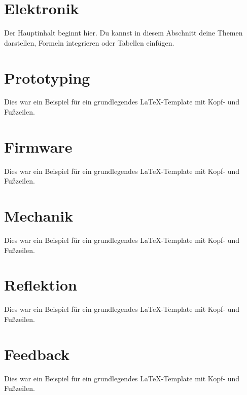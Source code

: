 \documentclass[a4paper,12pt]{scrartcl}
\begin{document}
\section{Elektronik}
Der Hauptinhalt beginnt hier. Du kannst in diesem Abschnitt deine Themen darstellen, Formeln integrieren oder Tabellen einfügen.

\section{Prototyping}
Dies war ein Beispiel für ein grundlegendes LaTeX-Template mit Kopf- und Fußzeilen.

\section{Firmware}
Dies war ein Beispiel für ein grundlegendes LaTeX-Template mit Kopf- und Fußzeilen.

\section{Mechanik}
Dies war ein Beispiel für ein grundlegendes LaTeX-Template mit Kopf- und Fußzeilen.

\section{Reflektion}
Dies war ein Beispiel für ein grundlegendes LaTeX-Template mit Kopf- und Fußzeilen.

\section{Feedback}
Dies war ein Beispiel für ein grundlegendes LaTeX-Template mit Kopf- und Fußzeilen.

\newpage

\ifacronymspage
  

  \thispagestyle{empty}
  \newpage
\fi

\iflistoffigurespage
  \listoffigures
\fi

\iflistoftablespage
  \listoftables
\fi

\iflistoffigurespage
  \thispagestyle{empty}
  \newpage
\else
  \iflistoftablespage
    \thispagestyle{empty}
    \newpage
  \fi
\fi


\ifbibliographypage
  \printbibliography[title={Literaturverzeichnis}]
  \thispagestyle{empty}
\fi
\end{document}
